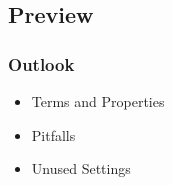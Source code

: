 \subsection{Preview}

\begin{frame}
	\frametitle{Outlook}

	\begin{itemize} %
	\item Terms and Properties
	\item Pitfalls
	\item Unused Settings
	\end{itemize}
\end{frame}



\appendix

\begin{frame}[allowframebreaks]
	
	
\end{frame}




